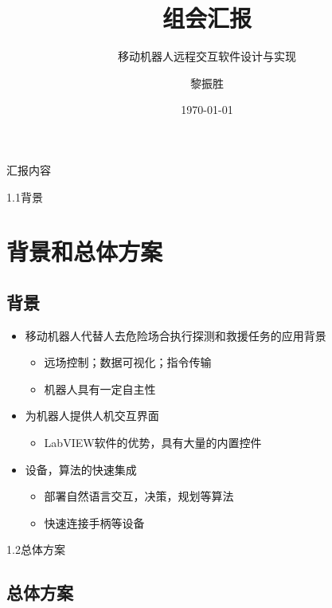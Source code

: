 \documentclass{beamer}
\title{组会汇报}
\subtitle{移动机器人远程交互软件设计与实现}
\institute{C400}
\author{黎振胜}
\date{\today}
\begin{document}
\begin{frame}
\maketitle
\end{frame}
\begin{frame}[t]{汇报内容}
    \tableofcontents[pausesections]
\end{frame}
\begin{frame}[t]{1.1背景}
    \section{背景和总体方案}
    \subsection{背景}
    \begin{itemize}
        \item 移动机器人代替人去危险场合执行探测和救援任务的应用背景
            \begin{itemize}
                \item 远场控制；数据可视化；指令传输
                \item 机器人具有一定自主性
            \end{itemize}
        \item 为机器人提供人机交互界面
            \begin{itemize}
                \item LabVIEW软件的优势，具有大量的内置控件
            \end{itemize}
        \item 设备，算法的快速集成
            \begin{itemize}
                \item 部署自然语言交互，决策，规划等算法
                \item 快速连接手柄等设备
            \end{itemize}
    \end{itemize}
\end{frame}
\begin{frame}[t]{1.2总体方案}
    \subsection{总体方案}
\end{frame}
\end{document}
